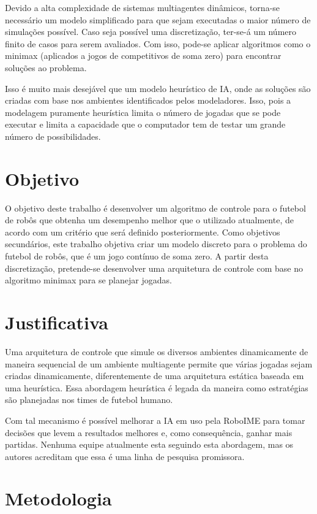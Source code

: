 Devido a alta complexidade de sistemas multiagentes dinâmicos, torna-se
necessário um modelo simplificado para que sejam executadas o maior número de
simulações possível.  Caso seja possível uma discretização, ter-se-á um número
finito de casos para serem avaliados. Com isso, pode-se aplicar algoritmos como
o minimax (aplicados a jogos de competitivos de soma zero) para encontrar
soluções ao problema.

Isso é muito mais desejável que um modelo heurístico de IA, onde as soluções são
criadas com base nos ambientes identificados pelos modeladores. Isso, pois a
modelagem puramente heurística limita o número de jogadas que se pode executar e
limita a capacidade que o computador tem de testar um grande número de possibilidades.

\section{Objetivo}

O objetivo deste trabalho é desenvolver um algoritmo de controle para o futebol
de robôs que obtenha um desempenho melhor que o utilizado atualmente, de acordo
com um critério que será definido posteriormente.
Como objetivos secundários, este trabalho objetiva criar um modelo discreto para
o problema do futebol de robôs, que é um jogo contínuo de soma zero.
A partir desta discretização, pretende-se desenvolver uma arquitetura de
controle com base no algoritmo minimax para se planejar jogadas.

\section{Justificativa}

Uma arquitetura de controle que simule os diversos ambientes dinamicamente de
maneira sequencial de um ambiente multiagente permite que várias jogadas sejam
criadas dinamicamente, diferentemente de uma arquitetura estática baseada em uma
heurística. Essa abordagem heurística é legada da maneira como estratégias são
planejadas nos times de futebol humano.

Com tal mecanismo é possível melhorar a IA em uso pela RoboIME
para tomar decisões que levem a resultados melhores e, como consequência, ganhar
mais partidas. Nenhuma equipe atualmente esta seguindo esta abordagem, mas os
autores acreditam que essa é uma linha de pesquisa promissora.

\section{Metodologia}

